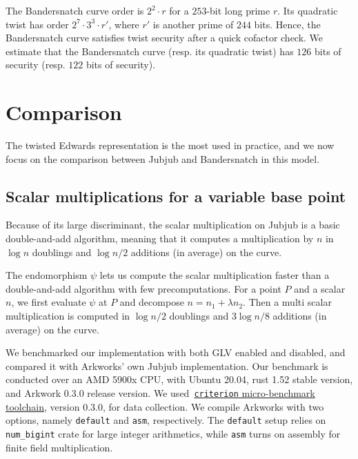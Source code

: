 \documentclass[smallextended]{svjour3}
\newcommand{\ZZ}[1]{\color{cyan}#1\color{black}}
\begin{document}
The Bandersnatch curve order is $2^2\cdot r$ for a $253$-bit long
prime $r$.
Its quadratic twist has order
$2^7 \cdot 3^3 \cdot r'$, where $r'$ is another prime of $244$ bits.
Hence, the Bandersnatch curve satisfies twist security after a quick cofactor
check.
We estimate that the Bandersnatch curve (resp. its quadratic twist)
has $126$ bits of security (resp. $122$ bits of security).


\section{Comparison}\label{sec:comparison}

The twisted Edwards representation is the most used in practice, and we now focus on the comparison between Jubjub and Bandersnatch in this model.

\subsection{Scalar multiplications for a variable base point}
Because of its large discriminant, the scalar multiplication on Jubjub
is a basic double-and-add algorithm, meaning that it computes a
multiplication by $n$ in $\log n$ doublings and $\log n/2$
additions (in average) on the curve. 

The endomorphism $\psi$ lets us compute the scalar multiplication
faster than a double-and-add algorithm with few precomputations. For a
point $P$ and a scalar $n$, we first evaluate $\psi$ at $P$ and
decompose $n = n_1 + \lambda n_2$. Then a multi scalar multiplication
is computed in $\log n/2$ doublings and $3\log n/8$ additions (in average) on the curve.

We benchmarked our implementation with both GLV enabled and disabled, and 
compared it with Arkworks' own Jubjub implementation. 
Our benchmark is conducted over an AMD 5900x CPU, with Ubuntu 20.04,
rust 1.52 stable version, and Arkwork 0.3.0 release version.
We used~\href{https://docs.rs/criterion}{\texttt{criterion}
  micro-benchmark toolchain},  version 0.3.0, for data collection. We
compile Arkworks with two options, namely \texttt{default} and
\texttt{asm}, respectively.
The \texttt{default} setup relies on \texttt{num\_bigint} crate for
large integer arithmetics, while \texttt{asm} turns on assembly for
finite field multiplication. 
\end{document}
